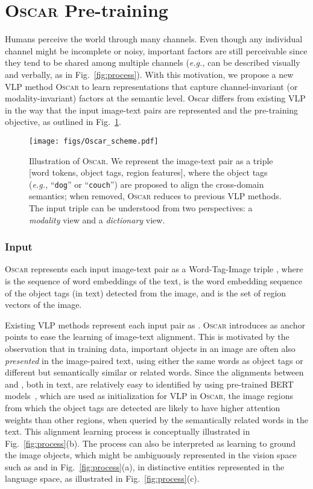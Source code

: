 \documentclass[runningheads]{llncs}
\newcommand{\eg}[0]{\emph{e.g., }}
\newcommand{\short}{\textsc{Oscar}}
\begin{document}
\vspace{-3mm}
\section{\short{} Pre-training}
\vspace{-3mm}
Humans perceive the world through many channels. Even though any individual channel might be incomplete or noisy, important factors are still perceivable since they tend to be shared among multiple channels (\eg  can be described visually and verbally, as in Fig.~\ref{fig:process}). With this motivation, we propose a new VLP method \short{} to learn representations that capture channel-invariant (or modality-invariant) factors at the semantic level.
Oscar differs from existing VLP in the way that the input image-text pairs are represented and the pre-training objective, as outlined in Fig.~\ref{fig:oscar}.


\begin{figure}[t!]
\centering
\texttt{[image: figs/Oscar\_scheme.pdf]}
\caption{Illustration of \short{}. We represent the image-text pair as a triple [\colorbox{red!10}{word tokens},  \colorbox{blue!10}{object tags}, \colorbox{mygreen!10}{region features}], where the object tags (\eg ``\texttt{dog}'' or ``\texttt{couch}'') are proposed to align the cross-domain semantics; when removed, \short{} reduces to previous VLP methods. The input triple can be understood from two perspectives: a {\it modality} view and a {\it dictionary} view.}
\label{fig:oscar}
\end{figure}


\subsubsection{Input}

\short{} represents each input image-text pair as a Word-Tag-Image triple , where  is the sequence of word embeddings of the text,  is the word embedding sequence of the object tags (in text) detected from the image, and  is the set of region vectors of the image.

Existing VLP methods represent each input pair as . \short{} introduces  as anchor points to ease the learning of image-text alignment. This is motivated by the observation that in training data, important objects in an image are often also \emph{presented} in the image-paired text, using either the same words as object tags or different but semantically similar or related words. Since the alignments between  and , both in text, are relatively easy to identified by using pre-trained BERT models~\cite{devlin2019bert}, which are used as initialization for VLP in \short, the image regions from which the object tags are detected are likely to have higher attention weights than other regions, when queried by the semantically related words in the text. This alignment learning process is conceptually illustrated in Fig.~\ref{fig:process}(b). The process can also be interpreted as learning to ground the image objects, which might be ambiguously represented in the vision space such as  and  in Fig.~\ref{fig:process}(a), in distinctive entities represented in the language space, as illustrated in Fig.~\ref{fig:process}(c).
 
\end{document}
